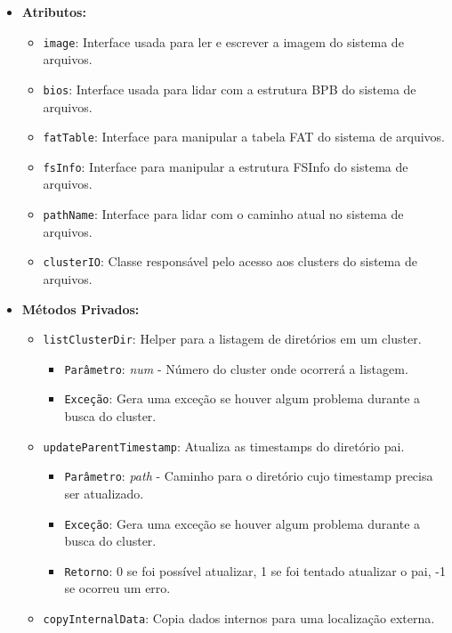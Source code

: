 \documentclass[
    12pt,				%
    oneside,   	        %
    a4paper,			%
    english,			%
    french,				%
    spanish,			%
    brazil,				%
    ]{pacotes/abntex2}
\begin{document}
\begin{itemize}
    \item \textbf{Atributos:}
        \begin{itemize}
            \item \texttt{image}: Interface usada para ler e escrever a imagem do sistema de arquivos.
            \item \texttt{bios}: Interface usada para lidar com a estrutura BPB do sistema de arquivos.
            \item \texttt{fatTable}: Interface para manipular a tabela FAT do sistema de arquivos.
            \item \texttt{fsInfo}: Interface para manipular a estrutura FSInfo do sistema de arquivos.
            \item \texttt{pathName}: Interface para lidar com o caminho atual no sistema de arquivos.
            \item \texttt{clusterIO}: Classe responsável pelo acesso aos clusters do sistema de arquivos.
        \end{itemize}
    \item \textbf{Métodos Privados:}
        \begin{itemize}
            \item \texttt{listClusterDir}: Helper para a listagem de diretórios em um cluster.
            \begin{itemize}
                \item \texttt{Parâmetro}: \textit{num} - Número do cluster onde ocorrerá a listagem.
                \item \texttt{Exceção}: Gera uma exceção se houver algum problema durante a busca do cluster.
            \end{itemize}
            \item \texttt{updateParentTimestamp}: Atualiza as timestamps do diretório pai.
            \begin{itemize}
                \item \texttt{Parâmetro}: \textit{path} - Caminho para o diretório cujo timestamp precisa ser atualizado.
                \item \texttt{Exceção}: Gera uma exceção se houver algum problema durante a busca do cluster.
                \item \texttt{Retorno}: 0 se foi possível atualizar, 1 se foi tentado atualizar o pai, -1 se ocorreu um erro.
            \end{itemize}
            \item \texttt{copyInternalData}: Copia dados internos para uma localização externa.

\end{itemize}
\end{itemize}
\end{document}
